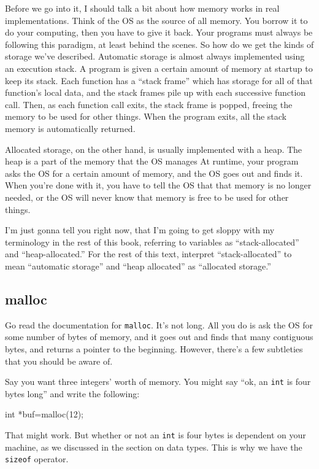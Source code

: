 \documentclass[ebook,11pt,oneside,openany]{memoir}
\begin{document}
Before we go into it, I should talk a bit about how memory works in real implementations. Think of the OS as the source of all memory. You borrow it to do your computing, then you have to give it back. Your programs must always be following this paradigm, at least behind the scenes. So how do we get the kinds of storage we've described. Automatic storage is almost always implemented using an execution stack. A program is given a certain amount of memory at startup to keep its stack. Each function has a ``stack frame'' which has storage for all of that function's local data, and the stack frames pile up with each successive function call. Then, as each function call exits, the stack frame is popped, freeing the memory to be used for other things. When the program exits, all the stack memory is automatically returned.

Allocated storage, on the other hand, is usually implemented with a heap. The heap is a part of the memory that the OS manages At runtime, your program asks the OS for a certain amount of memory, and the OS goes out and finds it. When you're done with it, you have to tell the OS that that memory is no longer needed, or the OS will never know that memory is free to be used for other things.

I'm just gonna tell you right now, that I'm going to get sloppy with my terminology in the rest of this book, referring to variables as ``stack-allocated'' and ``heap-allocated.'' For the rest of this text, interpret ``stack-allocated'' to mean ``automatic storage'' and ``heap allocated'' as ``allocated storage.''

\subsection{malloc}
Go read the documentation for \texttt{malloc}. It's not long. All you do is ask the OS for some number of bytes of memory, and it goes out and finds that many contiguous bytes, and returns a pointer to the beginning. However, there's a few subtleties that you should be aware of.

Say you want three integers' worth of memory. You might say ``ok, an \texttt{int} is four bytes long'' and write the following: 

\begin{code}[language=C]
int *buf=malloc(12);
\end{code}

That might work. But whether or not an \texttt{int} is four bytes is dependent on your machine, as we discussed in the section on data types. This is why we have the \texttt{sizeof} operator.
\end{document}

